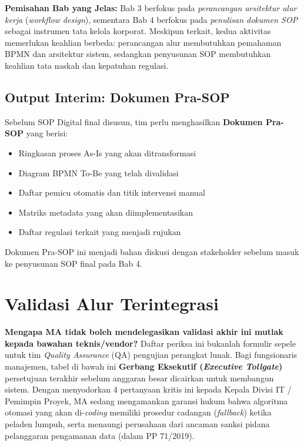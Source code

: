 \documentclass[12pt,a4paper]{report}
\begin{document}
\begin{warnbox}
\textbf{Pemisahan Bab yang Jelas:} Bab 3 berfokus pada \textit{perancangan arsitektur alur kerja} (\textit{workflow design}), sementara Bab 4 berfokus pada \textit{penulisan dokumen SOP} sebagai instrumen tata kelola korporat. Meskipun terkait, kedua aktivitas memerlukan keahlian berbeda: perancangan alur membutuhkan pemahaman BPMN dan arsitektur sistem, sedangkan penyusunan SOP membutuhkan keahlian tata naskah dan kepatuhan regulasi.
\end{warnbox}

\subsection{Output Interim: Dokumen Pra-SOP}

Sebelum SOP Digital final disusun, tim perlu menghasilkan \textbf{Dokumen Pra-SOP} yang berisi:
\begin{itemize}[leftmargin=*]
\item Ringkasan proses As-Is yang akan ditransformasi
\item Diagram BPMN To-Be yang telah divalidasi
\item Daftar pemicu otomatis dan titik intervensi manual
\item Matriks metadata yang akan diimplementasikan
\item Daftar regulasi terkait yang menjadi rujukan
\end{itemize}

Dokumen Pra-SOP ini menjadi bahan diskusi dengan stakeholder sebelum masuk ke penyusunan SOP final pada Bab 4.

\section{Validasi Alur Terintegrasi}
\begin{plnbox}
\small
\textbf{Mengapa MA tidak boleh mendelegasikan validasi akhir ini mutlak kepada bawahan teknis/vendor?}
Daftar periksa ini bukanlah formulir sepele untuk tim \textit{Quality Assurance} (QA) pengujian perangkat lunak. Bagi fungsionaris manajemen, tabel di bawah ini \textbf{Gerbang Eksekutif (\textit{Executive Tollgate})} persetujuan terakhir sebelum anggaran besar dicairkan untuk membangun sistem. Dengan menyodorkan 4 pertanyaan kritis ini kepada Kepala Divisi IT / Pemimpin Proyek, MA sedang mengamankan garansi hukum bahwa algoritma otomasi yang akan di-\textit{coding} memiliki prosedur cadangan (\textit{fallback}) ketika peladen lumpuh, serta menaungi perusahaan dari ancaman sanksi pidana pelanggaran pengamanan data (dalam PP 71/2019).
\end{plnbox}
\end{document}
